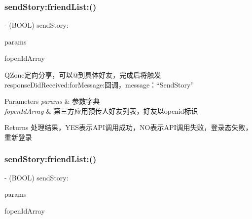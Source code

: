 \subsubsection{\texorpdfstring{send\+Story\+:friend\+List\+:()}{sendStory:friendList:()}\hspace{0.1cm}{\footnotesize\ttfamily [1/2]}}
{\footnotesize\ttfamily -\/ (B\+O\+OL) send\+Story\+: \begin{DoxyParamCaption}\item[{(N\+S\+Mutable\+Dictionary $\ast$)}]{params }\item[{friendList:(N\+S\+Array $\ast$)}]{fopen\+Id\+Array }\end{DoxyParamCaption}}

Q\+Zone定向分享，可以@到具体好友，完成后将触发response\+Did\+Received\+:for\+Message\+:回调，message：“\+Send\+Story” 
\begin{DoxyParams}{Parameters}
{\em params} & 参数字典 \\
\hline
{\em fopen\+Id\+Array} & 第三方应用预传人好友列表，好友以openid标识 \\
\hline
\end{DoxyParams}
\begin{DoxyReturn}{Returns}
处理结果，\+Y\+E\+S表示\+A\+P\+I调用成功，\+N\+O表示\+A\+P\+I调用失败，登录态失败，重新登录 
\end{DoxyReturn}
\mbox{\label{interface_tencent_o_auth_aa76ffb6e9da35a33210db470dc84f16d}} 
\subsubsection{\texorpdfstring{send\+Story\+:friend\+List\+:()}{sendStory:friendList:()}\hspace{0.1cm}{\footnotesize\ttfamily [2/2]}}
{\footnotesize\ttfamily -\/ (B\+O\+OL) send\+Story\+: \begin{DoxyParamCaption}\item[{(N\+S\+Mutable\+Dictionary $\ast$)}]{params }\item[{friendList:(N\+S\+Array $\ast$)}]{fopen\+Id\+Array }\end{DoxyParamCaption}}

